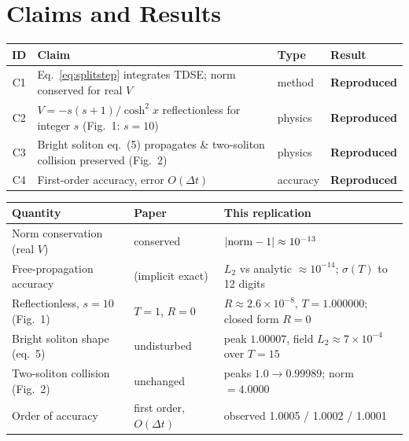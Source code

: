 \documentclass[11pt]{article}
\begin{document}
\section{Claims and Results}
\begin{table}[h]
\centering\small
\begin{tabular}{@{}clll@{}}
\toprule
ID & Claim & Type & Result \\
\midrule
C1 & Eq.~\eqref{eq:splitstep} integrates TDSE; norm conserved for real $V$ & method & \textbf{Reproduced} \\
C2 & $V=-s(s{+}1)/\cosh^2 x$ reflectionless for integer $s$ (Fig.~1: $s{=}10$) & physics & \textbf{Reproduced} \\
C3 & Bright soliton eq.~(5) propagates \& two-soliton collision preserved (Fig.~2) & physics & \textbf{Reproduced} \\
C4 & First-order accuracy, error $O(\Delta t)$ & accuracy & \textbf{Reproduced} \\
\bottomrule
\end{tabular}
\end{table}

\begin{table}[h]
\centering\small
\begin{tabular}{@{}lll@{}}
\toprule
Quantity & Paper & This replication \\
\midrule
Norm conservation (real $V$) & conserved & $|{\rm norm}-1| \approx 10^{-13}$ \\
Free-propagation accuracy    & (implicit exact) & $L_2$ vs analytic $\approx 10^{-14}$; $\sigma(T)$ to 12 digits \\
Reflectionless, $s=10$ (Fig.~1) & $T=1$, $R=0$ & $R\approx 2.6\times10^{-8}$, $T=1.000000$; closed form $R=0$ \\
Bright soliton shape (eq.~5) & undisturbed & peak $1.00007$, field $L_2\approx 7\times10^{-4}$ over $T=15$ \\
Two-soliton collision (Fig.~2) & unchanged & peaks $1.0\to 0.99989$; norm $=4.0000$ \\
Order of accuracy & first order, $O(\Delta t)$ & observed 1.0005 / 1.0002 / 1.0001 \\
\bottomrule
\end{tabular}
\end{table}
\end{document}
